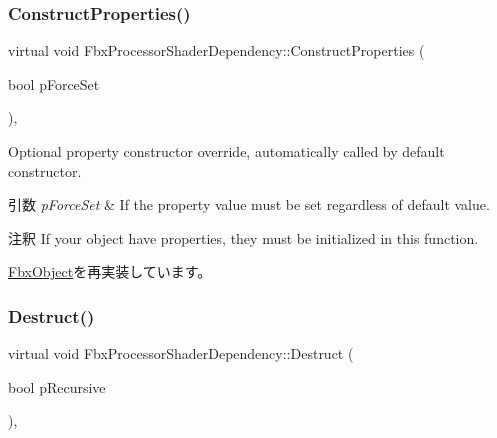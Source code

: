 \mbox{\label{class_fbx_processor_shader_dependency_a077ea3e1c83d0a42e597c60153fa5e9a}} 
\subsubsection{\texorpdfstring{Construct\+Properties()}{ConstructProperties()}}
{\footnotesize\ttfamily virtual void Fbx\+Processor\+Shader\+Dependency\+::\+Construct\+Properties (\begin{DoxyParamCaption}\item[{bool}]{p\+Force\+Set }\end{DoxyParamCaption})\hspace{0.3cm}{\ttfamily [protected]}, {\ttfamily [virtual]}}

Optional property constructor override, automatically called by default constructor. 
\begin{DoxyParams}{引数}
{\em p\+Force\+Set} & If the property value must be set regardless of default value. \\
\hline
\end{DoxyParams}
\begin{DoxyRemark}{注釈}
If your object have properties, they must be initialized in this function. 
\end{DoxyRemark}


\hyperlink{class_fbx_object_ad44f814323dc1b5e78bff1bfc608b4bb}{Fbx\+Object}を再実装しています。

\mbox{\label{class_fbx_processor_shader_dependency_aba3453491b05632a4972d32a04e8b283}} 
\subsubsection{\texorpdfstring{Destruct()}{Destruct()}}
{\footnotesize\ttfamily virtual void Fbx\+Processor\+Shader\+Dependency\+::\+Destruct (\begin{DoxyParamCaption}\item[{bool}]{p\+Recursive }\end{DoxyParamCaption})\hspace{0.3cm}{\ttfamily [protected]}, {\ttfamily [virtual]}}

